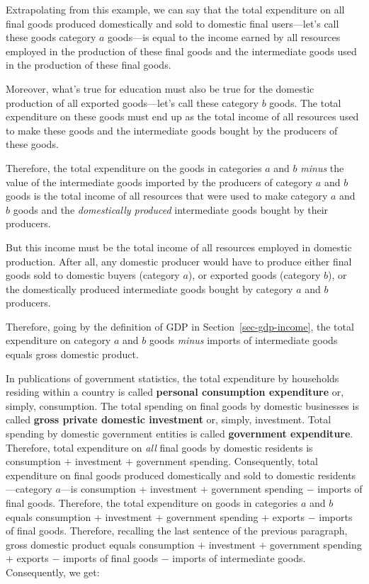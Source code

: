 \documentclass[
  letterpaper,
]{book}
\theoremstyle{plain}
\theoremstyle{remark}
\begin{document}
Extrapolating from this example, we can say that the total expenditure
on all final goods produced domestically and sold to domestic final
users---let's call these goods category \(a\) goods---is equal to the
income earned by all resources employed in the production of these final
goods and the intermediate goods used in the production of these final
goods.

Moreover, what's true for education must also be true for the domestic
production of all exported goods---let's call these category \(b\)
goods. The total expenditure on these goods must end up as the total
income of all resources used to make these goods and the intermediate
goods bought by the producers of these goods.

Therefore, the total expenditure on the goods in categories \(a\) and
\(b\) \emph{minus} the value of the intermediate goods imported by the
producers of category \(a\) and \(b\) goods is the total income of all
resources that were used to make category \(a\) and \(b\) goods and the
\emph{domestically produced} intermediate goods bought by their
producers.

But this income must be the total income of all resources employed in
domestic production. After all, any domestic producer would have to
produce either final goods sold to domestic buyers (category \(a\)), or
exported goods (category \(b\)), or the domestically produced
intermediate goods bought by category \(a\) and \(b\) producers.

Therefore, going by the definition of GDP in
Section~\ref{sec-gdp-income}, the total expenditure on category \(a\)
and \(b\) goods \emph{minus} imports of intermediate goods equals gross
domestic product.

In publications of government statistics, the total expenditure by
households residing within a country is called \textbf{personal
consumption expenditure} or, simply, consumption. The total spending on
final goods by domestic businesses is called \textbf{gross private
domestic investment} or, simply, investment. Total spending by domestic
government entities is called \textbf{government expenditure}.
Therefore, total expenditure on \emph{all} final goods by domestic
residents is consumption \(+\) investment \(+\) government spending.
Consequently, total expenditure on final goods produced domestically and
sold to domestic residents---category \(a\)---is consumption \(+\)
investment \(+\) government spending \(-\) imports of final goods.
Therefore, the total expenditure on goods in categories \(a\) and \(b\)
equals consumption \(+\) investment \(+\) government spending \(+\)
exports \(-\) imports of final goods. Therefore, recalling the last
sentence of the previous paragraph, gross domestic product equals
consumption \(+\) investment \(+\) government spending \(+\) exports
\(-\) imports of final goods \(-\) imports of intermediate goods.
Consequently, we get:
\end{document}
